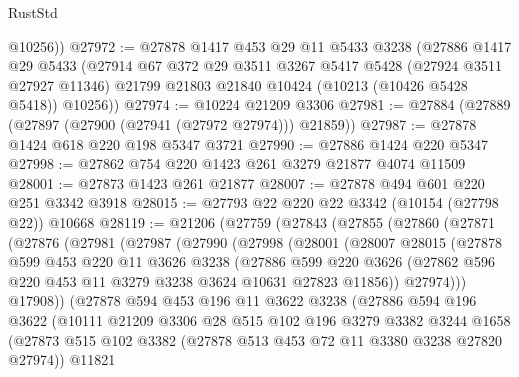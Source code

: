 \begin{lexlean}{RustStd}
\begin{coremodule}
{\begin{coremodule}
{{{{{{{{{{{{{{{{{{{{{{{{{{        @10256))
@27972 := @27878
    @1417
    @453
    @29
    @11
    @5433
    @3238
    (@27886
      @1417
      @29
      @5433
      (@27914
        @67
        @372
        @29
        @3511
        @3267
        @5417
        @5428
        (@27924 @3511 @27927 @11346)
        @21799
        @21803
        @21840
        @10424
        (@10213 (@10426 @5428 @5418))
        @10256))
@27974 := @10224 @21209 @3306
@27981 := @27884 (@27889 (@27897 (@27900 (@27941 (@27972 @27974))) @21859))
@27987 := @27878 @1424 @618 @220 @198 @5347 @3721
@27990 := @27886 @1424 @220 @5347
@27998 := @27862 @754 @220 @1423 @261 @3279 @21877 @4074 @11509
@28001 := @27873 @1423 @261 @21877
@28007 := @27878 @494 @601 @220 @251 @3342 @3918
@28015 := @27793 @22 @220 @22 @3342 (@10154 (@27798 @22)) @10668
@28119 := @21206
    (@27759
      (@27843
        (@27855
          (@27860
            (@27871
              (@27876
                (@27981
                  (@27987
                    (@27990
                      (@27998
                        (@28001
                          (@28007
                            @28015
                            (@27878
                              @599
                              @453
                              @220
                              @11
                              @3626
                              @3238
                              (@27886
                                @599
                                @220
                                @3626
                                (@27862 @596 @220 @453 @11 @3279 @3238 @3624 @10631 @27823 @11856))
                              @27974)))
                        @17908))
                    (@27878
                      @594
                      @453
                      @196
                      @11
                      @3622
                      @3238
                      (@27886
                        @594
                        @196
                        @3622
                        (@10111
                          @21209
                          @3306
                          @28
                          @515
                          @102
                          @196
                          @3279
                          @3382
                          @3244
                          @1658
                          (@27873
                            @515
                            @102
                            @3382
                            (@27878 @513 @453 @72 @11 @3380 @3238 @27820 @27974))
                          @11821
}}}}}}}}}}}}}}}}}}}}}}}}}}
\end{coremodule}}
\end{coremodule}
\end{lexlean}
